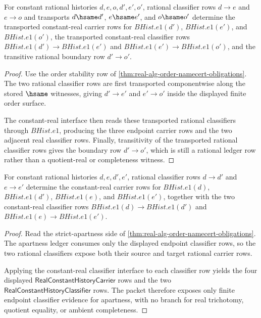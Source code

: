 \begin{theorem}
\label{thm:real-alg-order-rational-order-boundary-companion}
For constant rational histories $d,e,o,d',e',o'$, rational classifier rows $d\to e$ and $e\to o$ and transports $d\hsame d'$, $e\hsame e'$, and $o\hsame o'$ determine the transported constant-real carrier rows for $BHist.e1(d')$, $BHist.e1(e')$, and $BHist.e1(o')$, the transported constant-real classifier rows $BHist.e1(d')\to BHist.e1(e')$ and $BHist.e1(e')\to BHist.e1(o')$, and the transitive rational boundary row $d'\to o'$.
\end{theorem}
\begin{proof}
Use the order stability row of \autoref{thm:real-alg-order-namecert-obligations}. The two rational classifier rows are first transported componentwise along the stored $\hsame$ witnesses, giving $d'\to e'$ and $e'\to o'$ inside the displayed finite order surface.

The constant-real interface then reads these transported rational classifiers through $BHist.e1$, producing the three endpoint carrier rows and the two adjacent real classifier rows. Finally, transitivity of the transported rational classifier rows gives the boundary row $d'\to o'$, which is still a rational ledger row rather than a quotient-real or completeness witness.
\end{proof}

\begin{theorem}
\label{thm:real-alg-order-apartness-companion}
For constant rational histories $d,e,d',e'$, rational classifier rows $d\to d'$ and $e\to e'$ determine the constant-real carrier rows for $BHist.e1(d)$, $BHist.e1(d')$, $BHist.e1(e)$, and $BHist.e1(e')$, together with the two constant-real classifier rows $BHist.e1(d)\to BHist.e1(d')$ and $BHist.e1(e)\to BHist.e1(e')$.
\end{theorem}
\begin{proof}
Read the strict-apartness side of \autoref{thm:real-alg-order-namecert-obligations}. The apartness ledger consumes only the displayed endpoint classifier rows, so the two rational classifiers expose both their source and target rational carrier rows.

Applying the constant-real classifier interface to each classifier row yields the four displayed $\mathsf{RealConstantHistoryCarrier}$ rows and the two $\mathsf{RealConstantHistoryClassifier}$ rows. The packet therefore exposes only finite endpoint classifier evidence for apartness, with no branch for real trichotomy, quotient equality, or ambient completeness.
\end{proof}

